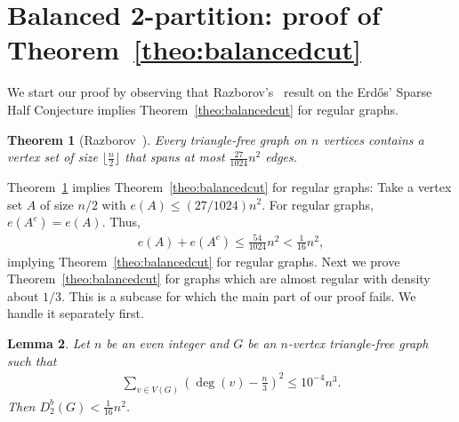 \documentclass[11pt]{article}
\newtheorem{theo}{Theorem}
\newtheorem{lemma}[theo]{Lemma}
\theoremstyle{definition}
\numberwithin{theo}{section}
\begin{document}
\section{Balanced 2-partition: proof of Theorem~\ref{theo:balancedcut}}
\label{secmT1}
We start our proof by observing that Razborov's~\cite{flagsRaz} result on the Erd\H{o}s' Sparse Half Conjecture implies Theorem~\ref{theo:balancedcut} for regular graphs. 
\begin{theo}[Razborov~\cite{flagsRaz}]
\label{Razprogr}
Every triangle-free graph on $n$ vertices contains a vertex set of size $\lfloor\frac{n}{2}\rfloor$ that spans at most $\frac{27}{1024}n^2$ edges.
\end{theo}
 Theorem~\ref{Razprogr} implies Theorem~\ref{theo:balancedcut} for regular graphs: Take a vertex set $A$ of size $n/2$ with $e(A)\leq (27/1024)n^2$. For regular graphs,  $e(A^c)=e(A)$. Thus, 
 \begin{align*}
     e(A)+e(A^c)\leq \frac{54}{1024}n^2 <  \frac{1}{16}n^2,
 \end{align*}
 implying Theorem~\ref{theo:balancedcut} for regular graphs. Next we prove Theorem~\ref{theo:balancedcut} for graphs which are almost regular with density about $1/3$. This is a subcase for which the main part of our proof fails. We handle it separately first. 
\begin{lemma}
\label{lem:almostreg}
Let $n$ be an even integer and $G$ be an $n$-vertex triangle-free graph such that 
\begin{align}
\label{flaglemmacutsup}
    \sum_{v\in V(G)}\left(\deg(v)-\frac{n}{3}\right)^2\leq 10^{-4}n^3. 
    \end{align}
Then $D_2^b(G)< \frac{1}{16}n^2$.
\end{lemma}
\end{document}
